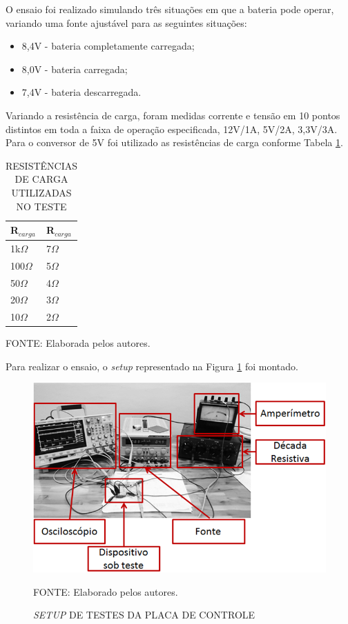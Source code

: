 \documentclass[
	12pt,				%
	openright,			%
	oneside,			%
	a4paper,			%
	english,			%
	french,				%
	spanish,			%
	brazil,				%
	oldfontcommands
	]{abntex2}
\begin{document}
	O ensaio foi realizado simulando três situações em que a bateria pode operar, variando uma fonte ajustável para as seguintes situações:

	\begin{itemize}
		\item 8,4V - bateria completamente carregada;
		\item 8,0V - bateria carregada;
		\item 7,4V - bateria descarregada.
	\end{itemize}
	
	Variando a resistência de carga, foram medidas corrente e tensão em 10 pontos distintos em toda a faixa de operação especificada, 12V/1A, 5V/2A, 3,3V/3A. Para o conversor de 5V foi utilizado as resistências de carga conforme Tabela \ref{Tab_res_teste}.
	
	\begin{table}[th]
	\caption{RESISTÊNCIAS DE CARGA UTILIZADAS NO TESTE}
	\label{Tab_res_teste}
	\centering
		\begin{tabular}{p{1.3cm}|p{1.3cm}}
			\textbf{R$_{carga}$} & \textbf{R$_{carga}$}\\
			\hline
			1k$\Omega$ & 7$\Omega$\\
			100$\Omega$ & 5$\Omega$\\
			50$\Omega$ & 4$\Omega$\\
			20$\Omega$ & 3$\Omega$\\
			10$\Omega$ & 2$\Omega$\\
		\end{tabular}	
	
	\begin{small}
	\vspace{3pt}
		FONTE: Elaborada pelos autores.
	\end{small}
	\end{table}
	
	Para realizar o ensaio, o \textit{setup} representado na Figura \ref{Fig_setup_cont} foi montado.
	
	\begin{figure}[th]
		\caption{\textit{SETUP} DE TESTES DA PLACA DE CONTROLE}
		\label{Fig_setup_cont}
		\centering
		\includegraphics[width=1\linewidth]{./figs/setup_cont}
			
		\begin{small}
			FONTE: Elaborado pelos autores.
		\end{small}
	\end{figure}
	\pagebreak
	
\end{document}
